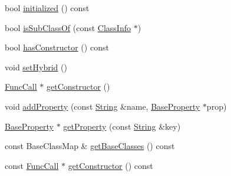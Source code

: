 \begin{DoxyCompactItemize}
bool \hyperlink{classSLB_1_1ClassInfo_a71a72dc3094692ff7bc636989c1c0a3b}{initialized} () const 
\item 
bool \hyperlink{classSLB_1_1ClassInfo_a58da8e631d76e90574f4cf0bd42ec0d9}{is\+Sub\+Class\+Of} (const \hyperlink{classSLB_1_1ClassInfo}{Class\+Info} $\ast$)
\item 
bool \hyperlink{classSLB_1_1ClassInfo_a099d77a6141476375e5cf3f6bd3a2ce5}{has\+Constructor} () const 
\item 
void \hyperlink{classSLB_1_1ClassInfo_a35c1556142a258fc2f281124b832fddc}{set\+Hybrid} ()
\item 
\hyperlink{classSLB_1_1FuncCall}{Func\+Call} $\ast$ \hyperlink{classSLB_1_1ClassInfo_a33759058e3be98fa76b93cb73b96c13f}{get\+Constructor} ()
\item 
void \hyperlink{classSLB_1_1ClassInfo_aba848bf328f05510335c0403e9a55396}{add\+Property} (const \hyperlink{namespaceSLB_a6a4c36e7004d99c0535c2c91c200c9a1}{String} \&name, \hyperlink{classSLB_1_1BaseProperty}{Base\+Property} $\ast$prop)
\item 
\hyperlink{classSLB_1_1BaseProperty}{Base\+Property} $\ast$ \hyperlink{classSLB_1_1ClassInfo_ad1a04bb97f10d00c375accc32de3c695}{get\+Property} (const \hyperlink{namespaceSLB_a6a4c36e7004d99c0535c2c91c200c9a1}{String} \&key)
\item 
const Base\+Class\+Map \& \hyperlink{classSLB_1_1ClassInfo_a6e4c97dbfdb75be11ecb518b67fe91f0}{get\+Base\+Classes} () const 
\item 
const \hyperlink{classSLB_1_1FuncCall}{Func\+Call} $\ast$ \hyperlink{classSLB_1_1ClassInfo_ac7fa65ec8faff5a0bffc866865a0083d}{get\+Constructor} () const 
\end{DoxyCompactItemize}
